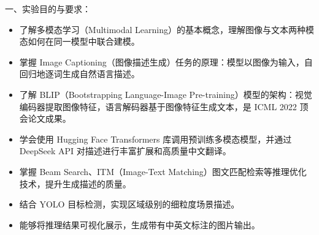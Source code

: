 \documentclass[12pt, a4paper]{article}
\begin{document}
\begin{labbox}{一、实验目的与要求：}{}

\begin{itemize}[leftmargin=2em, itemsep=0.3em]
    \item 了解多模态学习（Multimodal Learning）的基本概念，理解图像与文本两种模态如何在同一模型中联合建模。
    \item 掌握 Image Captioning（图像描述生成）任务的原理：模型以图像为输入，自回归地逐词生成自然语言描述。
    \item 了解 BLIP（Bootstrapping Language-Image Pre-training）模型的架构：视觉编码器提取图像特征，语言解码器基于图像特征生成文本，是 ICML 2022 顶会论文成果。
    \item 学会使用 Hugging Face Transformers 库调用预训练多模态模型，并通过 DeepSeek API 对描述进行丰富扩展和高质量中文翻译。
    \item 掌握 Beam Search、ITM（Image-Text Matching）图文匹配检索等推理优化技术，提升生成描述的质量。
    \item 结合 YOLO 目标检测，实现区域级别的细粒度场景描述。
    \item 能够将推理结果可视化展示，生成带有中英文标注的图片输出。
\end{itemize}

\end{labbox}
\end{document}
